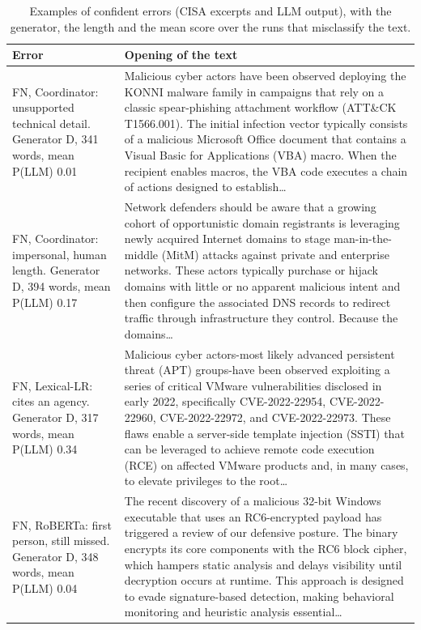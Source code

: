 \begin{table}[t]
\centering
\footnotesize
\caption{Examples of confident errors (CISA excerpts and LLM output), with the generator, the length and the mean score over the runs that misclassify the text.}
\label{tab:examples}
\begin{tabular}{p{4.2cm}p{12.8cm}}
\toprule
Error & Opening of the text \\
\midrule
FN, Coordinator: unsupported technical detail. Generator D, 341 words, mean P(LLM) 0.01 & Malicious cyber actors have been observed deploying the KONNI malware family in campaigns that rely on a classic spear-phishing attachment workflow (ATT\&CK T1566.001). The initial infection vector typically consists of a malicious Microsoft Office document that contains a Visual Basic for Applications (VBA) macro. When the recipient enables macros, the VBA code executes a chain of actions designed to establish\ldots \\
FN, Coordinator: impersonal, human length. Generator D, 394 words, mean P(LLM) 0.17 & Network defenders should be aware that a growing cohort of opportunistic domain registrants is leveraging newly acquired Internet domains to stage man-in-the-middle (MitM) attacks against private and enterprise networks. These actors typically purchase or hijack domains with little or no apparent malicious intent and then configure the associated DNS records to redirect traffic through infrastructure they control. Because the domains\ldots \\
FN, Lexical-LR: cites an agency. Generator D, 317 words, mean P(LLM) 0.34 & Malicious cyber actors-most likely advanced persistent threat (APT) groups-have been observed exploiting a series of critical VMware vulnerabilities disclosed in early 2022, specifically CVE-2022-22954, CVE-2022-22960, CVE-2022-22972, and CVE-2022-22973. These flaws enable a server-side template injection (SSTI) that can be leveraged to achieve remote code execution (RCE) on affected VMware products and, in many cases, to elevate privileges to the root\ldots \\
FN, RoBERTa: first person, still missed. Generator D, 348 words, mean P(LLM) 0.04 & The recent discovery of a malicious 32-bit Windows executable that uses an RC6-encrypted payload has triggered a review of our defensive posture. The binary encrypts its core components with the RC6 block cipher, which hampers static analysis and delays visibility until decryption occurs at runtime. This approach is designed to evade signature-based detection, making behavioral monitoring and heuristic analysis essential\ldots \\

\end{tabular}
\end{table}
